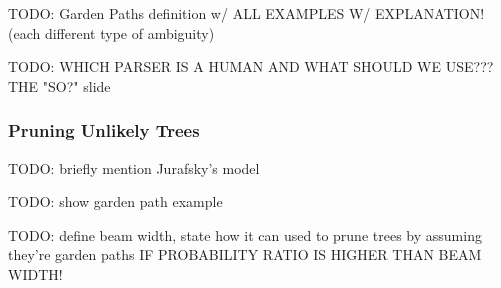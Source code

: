 \documentclass{article}
\begin{document}
TODO: Garden Paths definition w/ ALL EXAMPLES W/ EXPLANATION!
	(each different type of ambiguity)

TODO: WHICH PARSER IS A HUMAN AND WHAT SHOULD WE USE??? THE "SO?" slide

\subsubsection{Pruning Unlikely Trees}

TODO: briefly mention Jurafsky's model

TODO: show garden path example

TODO: define beam width, state how it can used to prune trees by assuming they're garden paths IF PROBABILITY RATIO IS HIGHER THAN BEAM WIDTH!
\end{document}

